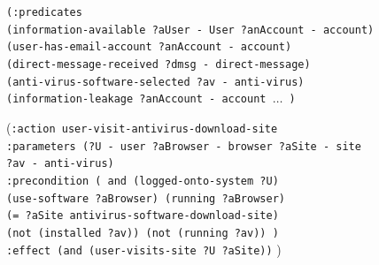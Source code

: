 \begin{figure}[pbt]
{{{{}
\hspace*{35pt}\texttt{(:predicates \\
\hspace*{35pt}(information-available ?aUser - User ?anAccount - account) \\
\hspace*{35pt}(user-has-email-account ?anAccount - account)\\
\hspace*{35pt}(direct-message-received ?dmsg - direct-message)\\
\hspace*{35pt}(anti-virus-software-selected ?av - anti-virus) \\
\hspace*{35pt}(information-leakage ?anAccount - account $\ldots$ )\\[15pt]
}

\hspace*{35pt}(\texttt{:action user-visit-antivirus-download-site}\\
\hspace*{35pt}\texttt{:parameters (?U - user ?aBrowser - browser ?aSite - site \\\hspace*{35pt} ?av - anti-virus)}\\
\hspace*{35pt}\texttt{:precondition ( and (logged-onto-system ?U) \\\hspace*{35pt} (use-software ?aBrowser) (running ?aBrowser) \\\hspace*{35pt} (= ?aSite antivirus-software-download-site) \\\hspace*{35pt} (not (installed ?av))  (not (running ?av)) )}\\
\hspace*{35pt}\texttt{:effect (and (user-visits-site ?U ?aSite))}
)\\[15pt]

}}}
\end{figure}
